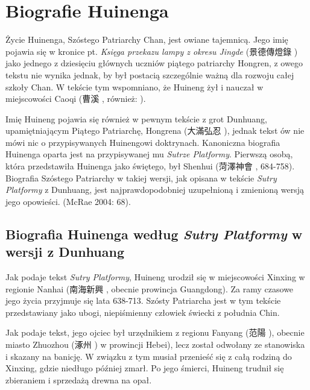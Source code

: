 \chapter{Biografie Huinenga}
Życie Huinenga, Szóstego Patriarchy Chan, jest owiane tajemnicą. Jego imię pojawia się w kronice pt. \textit{Księga przekazu lampy z okresu Jingde} (景德傳燈錄 ) jako jednego z dziesięciu głównych uczniów piątego patriarchy Hongren, z owego tekstu nie wynika jednak, by był postacią szczególnie ważną dla rozwoju całej szkoły Chan. W tekście tym wspomniano, że Huineng żył i nauczał w miejscowości Caoqi (曹溪 , również: ).

Imię Huineng pojawia się również w pewnym tekście z grot Dunhuang, upamiętniającym Piątego Patriarchę, Hongrena (大滿弘忍 ), jednak tekst ów nie mówi nic o przypisywanych Huinengowi doktrynach. Kanoniczna biografia Huinenga oparta jest na przypisywanej mu \textit{Sutrze Platformy}. Pierwszą osobą, która przedstawiła Huinenga jako świętego, był Shenhui (菏澤神會 , 684-758). Biografia Szóstego Patriarchy w takiej wersji, jak opisana w tekście \textit{Sutry Platformy} z Dunhuang, jest najprawdopodobniej uzupełnioną i zmienioną wersją jego opowieści. (McRae 2004: 68).

\section{Biografia Huinenga według \textit{Sutry Platformy} w wersji z Dunhuang}
Jak podaje tekst \textit{Sutry Platformy}, Huineng urodził się w miejscowości Xinxing w regionie Nanhai (南海新興 , obecnie prowincja Guangdong). Za ramy czasowe jego życia przyjmuje się lata 638-713. Szósty Patriarcha jest w tym tekście przedstawiany jako ubogi, niepiśmienny człowiek świecki z południa Chin.

Jak podaje tekst, jego ojciec był urzędnikiem z regionu Fanyang (范陽 ), obecnie miasto Zhuozhou (涿州 ) w prowincji Hebei), lecz został odwołany ze stanowiska i skazany na banicję. W związku z tym musiał przenieść się z całą rodziną do Xinxing, gdzie niedługo później zmarł. Po jego śmierci, Huineng trudnił się zbieraniem i sprzedażą drewna na opał.

